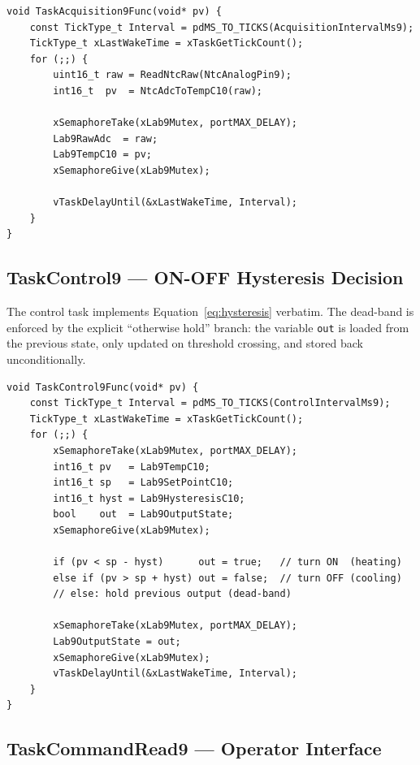 \documentclass[12pt]{article}
\begin{document}
\begin{lstlisting}[caption={TaskAcquisition9 --- 50\,ms ADC sample $\to$ tenths $^{\circ}$C}]
void TaskAcquisition9Func(void* pv) {
    const TickType_t Interval = pdMS_TO_TICKS(AcquisitionIntervalMs9);
    TickType_t xLastWakeTime = xTaskGetTickCount();
    for (;;) {
        uint16_t raw = ReadNtcRaw(NtcAnalogPin9);
        int16_t  pv  = NtcAdcToTempC10(raw);

        xSemaphoreTake(xLab9Mutex, portMAX_DELAY);
        Lab9RawAdc  = raw;
        Lab9TempC10 = pv;
        xSemaphoreGive(xLab9Mutex);

        vTaskDelayUntil(&xLastWakeTime, Interval);
    }
}
\end{lstlisting}

\subsection{TaskControl9 --- ON-OFF Hysteresis Decision}

The control task implements Equation~\ref{eq:hysteresis} verbatim. The dead-band is enforced by the explicit \enquote{otherwise hold} branch: the variable \texttt{out} is loaded from the previous state, only updated on threshold crossing, and stored back unconditionally.

\begin{lstlisting}[caption={TaskControl9 --- hysteresis decision}]
void TaskControl9Func(void* pv) {
    const TickType_t Interval = pdMS_TO_TICKS(ControlIntervalMs9);
    TickType_t xLastWakeTime = xTaskGetTickCount();
    for (;;) {
        xSemaphoreTake(xLab9Mutex, portMAX_DELAY);
        int16_t pv   = Lab9TempC10;
        int16_t sp   = Lab9SetPointC10;
        int16_t hyst = Lab9HysteresisC10;
        bool    out  = Lab9OutputState;
        xSemaphoreGive(xLab9Mutex);

        if (pv < sp - hyst)      out = true;   // turn ON  (heating)
        else if (pv > sp + hyst) out = false;  // turn OFF (cooling)
        // else: hold previous output (dead-band)

        xSemaphoreTake(xLab9Mutex, portMAX_DELAY);
        Lab9OutputState = out;
        xSemaphoreGive(xLab9Mutex);
        vTaskDelayUntil(&xLastWakeTime, Interval);
    }
}
\end{lstlisting}

\subsection{TaskCommandRead9 --- Operator Interface}
\end{document}
